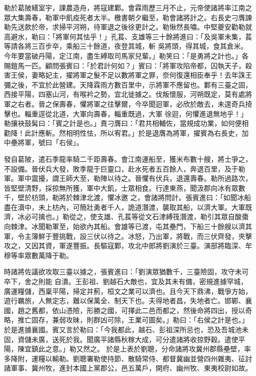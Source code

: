 \begin{pinyinscope}
 勒於葛陂繕室宇，課農造舟，將寇建鄴。會霖雨歷三月不止，元帝使諸將率江南之眾大集壽春，勒軍中飢疫死者太半。檄書朝夕繼至，勒會諸將計之。右長史刁膺諫勒先送款於帝，求掃平河朔，待軍退之後徐更計之。勒愀然長嘯。中堅夔安勸勒就高避水，勒曰：「將軍何其怯乎！」孔萇、支雄等三十餘將進曰：「及吳軍未集，萇等請各將三百步卒，乘船三十餘道，夜登其城，斬
 吳將頭，得其城，食其倉米。今年要當破丹陽，定江南，盡生縛取司馬家兒輩。」勒笑曰：「是勇將之計也。」各賜鎧馬一匹。顧問張賓曰：「於君計何如？」賓曰：「將軍攻陷帝都，囚執天子，殺害王侯，妻略妃主，擢將軍之髮不足以數將軍之罪，奈何復還相臣奉乎！去年誅王彌之後，不宜於此營建。天降霖雨方數百里中，示將軍不應留也。鄴有三臺之固，西接平陽，四塞山河，有喉衿之勢，宜北徙據之。伐叛懷服，河朔既定，莫有處將軍之右者。晉之保壽春，懼將軍之往擊爾，今卒聞迴軍，必欣於敵去，未遑奇兵掎擊也。輜重逕從北道，大軍向壽春，輜重既過，大軍
 徐迴，何懼進退無地乎！」勒攘袂鼓髯曰：「賓之計是也。」責刁膺曰：「君共相輔佐，當規成功業，如何便相勸降！此計應斬。然相明性怯，所以宥君。」於是退膺為將軍，擢賓為右長史，加中壘將軍，號曰「右侯」。



 發自葛陂，遣石季龍率騎二千距壽春。會江南運船至，獲米布數十艘，將士爭之，不設備。晉伏兵大發，敗季龍于巨靈口，赴水死者五百餘人，奔退百里，及于勒軍。軍中震擾，謂王師大至，勒陣以待之。晉懼有伏兵，退還壽春。勒所過路次，皆堅壁清野，採掠無所獲，軍中大飢，士眾相食。行達東燕，聞汲郡向冰有眾數千，壁於枋頭，勒將於棘津北渡，懼冰邀
 之，會諸將問計。張賓進曰：「如聞冰船盡在瀆中，未上枋內，可簡壯勇者千人，詭道潛渡，襲取其船，以濟大軍。大軍既濟，冰必可擒也。」勒從之，使支雄、孔萇等從文石津縛筏潛渡，勒引其眾自酸棗向棘津。冰聞勒軍至，始欲內其船。會雄等已渡，屯其壘門，下船三十餘艘以濟其軍，令主簿鮮于豐挑戰，設三伏以待之。冰怒，乃出軍，將戰，而三伏齊發，夾擊攻之，又因其資，軍遂豐振。長驅寇鄴，攻北中郎將劉演於三臺。演部將臨深、牟穆等率眾數萬降于勒。



 時諸將佐議欲攻取三臺以據之，張賓進曰：「劉演眾猶數千，三臺險固，攻守未可卒下，舍之則能
 自潰。王彭祖、劉越石大敵也，宜及其未有備，密規進據罕城，廣運糧儲，西稟平陽，掃定并薊，桓文之業可以濟也。且今天下鼎沸，戰爭方始，遊行羈旅，人無定志，難以保萬全、制天下也。夫得地者昌，失地者亡。邯鄲、襄國，趙之舊都，依山憑險，形勝之國，可擇此二邑而都之，然後命將四出，授以奇略，推亡固存，兼弱攻昧，則群凶可除，王業可圖矣。」勒曰：「右侯之計是也。」於是進據襄國。賓又言於勒曰：「今我都此，越石、彭祖深所忌也，恐及吾城池未固，資儲未廣，送死於我。聞廣平諸縣秋稼大成，可分遣諸將收掠野穀。遣使平陽，陳宜鎮此之意。」勒又然之。
 於是上表於劉聰，分命諸將攻冀州郡縣壘壁，率多降附，運糧以輸勒。劉聰署勒使持節、散騎常侍、都督冀幽並營四州雜夷、征討諸軍事、冀州牧，進封本國上黨郡公，邑五萬戶，開府、幽州牧、東夷校尉如故。




\end{pinyinscope}
